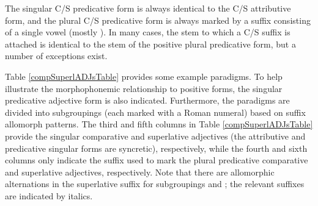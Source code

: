 The singular C/S predicative form is always identical %
to the C/S attributive form, and the plural C/S predicative form is always marked by a suffix consisting of a single vowel (mostly ). In many cases, the stem to which a C/S suffix is attached is identical %
to the stem of the positive plural predicative form, but a number of exceptions exist. 

Table \vref{compSuperlADJsTable} provides some example paradigms. 
To help illustrate the morphophonemic relationship to positive forms, the singular predicative adjective form is also indicated. %
Furthermore, the paradigms are divided into subgroupings (each marked with a Roman numeral) based on suffix allomorph patterns. The third and fifth columns in Table \ref{compSuperlADJsTable} provide the singular comparative and superlative adjectives (the attributive and predicative singular forms are syncretic), respectively, while the fourth and sixth columns only indicate the suffix used to mark the plural predicative comparative and superlative adjectives, respectively. Note that there are allomorphic alternations in the superlative suffix for subgroupings  and ; the relevant suffixes are indicated by italics. 

